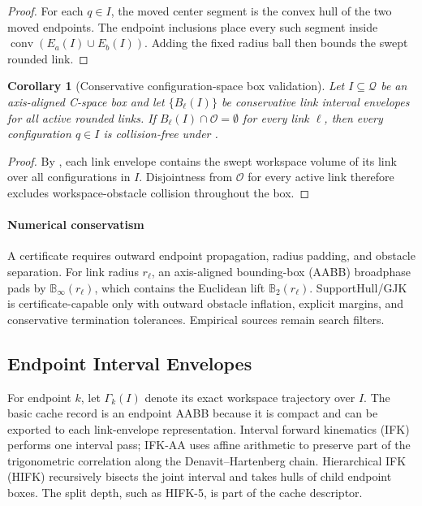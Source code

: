\documentclass[journal]{IEEEtran}
\newtheorem{corollary}{Corollary}
\newcommand{\Ball}{\ensuremath{\mathbb{B}}}
\newcommand{\calO}{\ensuremath{\mathcal{O}}}
\newcommand{\Q}{\ensuremath{\mathcal{Q}}}
\newcommand{\cspace}{\mbox{C-space}}
\begin{document}
\begin{proof}
For each $q\in I$, the moved center segment is the convex hull of the two moved
endpoints. The endpoint inclusions place every such segment inside
$\operatorname{conv}(E_a(I)\cup E_b(I))$. Adding the fixed radius ball then
bounds the swept rounded link.
\end{proof}

\begin{corollary}[Conservative configuration-space box validation]
\label{cor:box_validation}
Let $I\subseteq\Q$ be an axis-aligned \cspace{} box and let
$\{B_\ell(I)\}$ be conservative link interval envelopes for all active rounded
links. If $B_\ell(I)\cap\calO=\emptyset$ for every link $\ell$, then every
configuration $q\in I$ is collision-free under
.
\end{corollary}

\begin{proof}
By , each link envelope contains the swept
workspace volume of its link over all configurations in $I$. Disjointness from
$\calO$ for every active link therefore excludes workspace-obstacle collision
throughout the box.
\end{proof}

\paragraph{Numerical conservatism}
A certificate requires outward endpoint propagation, radius padding, and
obstacle separation. For link radius $r_\ell$, an axis-aligned bounding-box (AABB) broadphase pads by
$\Ball_\infty(r_\ell)$, which contains the Euclidean lift
$\Ball_2(r_\ell)$. SupportHull/GJK is certificate-capable only with outward
obstacle inflation, explicit margins, and conservative termination tolerances.
Empirical sources remain search filters.

\subsection{Endpoint Interval Envelopes}\label{sec:rewrite_endpoint_env}

For endpoint $k$, let $\Gamma_k(I)$ denote its exact workspace trajectory over
$I$. The basic cache record is an endpoint AABB because it is compact and can be
exported to each link-envelope representation. Interval forward kinematics
(IFK) performs one interval pass; IFK-AA uses affine arithmetic to preserve part
of the trigonometric correlation along the Denavit--Hartenberg chain.
Hierarchical IFK (HIFK) recursively bisects the joint interval and takes hulls of
child endpoint boxes. The split depth, such as HIFK-5, is part of the cache
descriptor.
\end{document}
